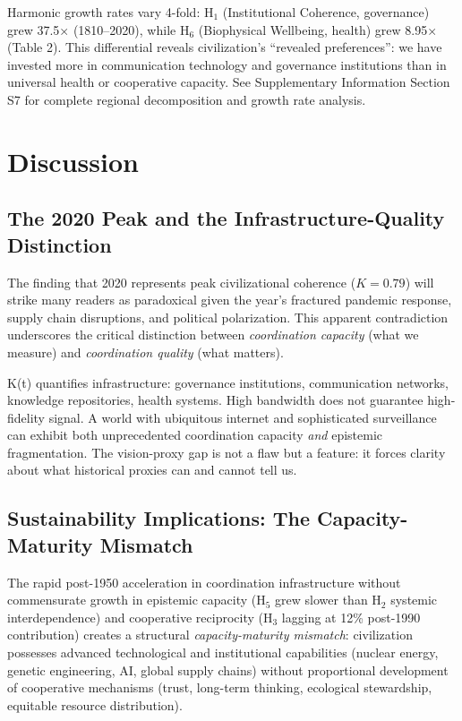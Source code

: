 \documentclass[11pt,letterpaper]{article}
\begin{document}
Harmonic growth rates vary 4-fold: H$_1$ (Institutional Coherence, governance) grew 37.5× (1810--2020), while H$_6$ (Biophysical Wellbeing, health) grew 8.95× (Table 2). This differential reveals civilization's ``revealed preferences'': we have invested more in communication technology and governance institutions than in universal health or cooperative capacity. See Supplementary Information Section S7 for complete regional decomposition and growth rate analysis.

\section{Discussion}

\subsection{The 2020 Peak and the Infrastructure-Quality Distinction}

The finding that 2020 represents peak civilizational coherence ($K=0.79$) will strike many readers as paradoxical given the year's fractured pandemic response, supply chain disruptions, and political polarization. This apparent contradiction underscores the critical distinction between \textit{coordination capacity} (what we measure) and \textit{coordination quality} (what matters).

K(t) quantifies infrastructure: governance institutions, communication networks, knowledge repositories, health systems. High bandwidth does not guarantee high-fidelity signal. A world with ubiquitous internet and sophisticated surveillance can exhibit both unprecedented coordination capacity \textit{and} epistemic fragmentation. The vision-proxy gap is not a flaw but a feature: it forces clarity about what historical proxies can and cannot tell us.

\subsection{Sustainability Implications: The Capacity-Maturity Mismatch}
\label{sec:capacity-maturity}

The rapid post-1950 acceleration in coordination infrastructure without commensurate growth in epistemic capacity (H$_5$ grew slower than H$_2$ systemic interdependence) and cooperative reciprocity (H$_3$ lagging at 12\% post-1990 contribution) creates a structural \textit{capacity-maturity mismatch}: civilization possesses advanced technological and institutional capabilities (nuclear energy, genetic engineering, AI, global supply chains) without proportional development of cooperative mechanisms (trust, long-term thinking, ecological stewardship, equitable resource distribution).
\end{document}
